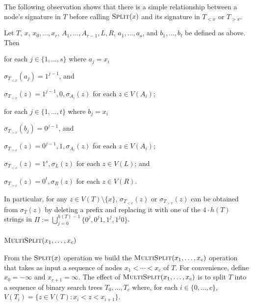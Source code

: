 \documentclass[10pt, conference, compsocconf]{IEEEtran}
\let\le\leqslant
\begin{document}

The following observation shows that there is a simple relationship between a node's signature in $T$ before calling $\textsc{Split}(x)$ and its signature in $T_{<x}$ or $T_{>x}$.

\begin{obs}
  Let $T$, $x$, $x_0,\dots,x_r$, $A_1,\dots,A_{r-1},L,R$, $a_1,\dots,a_s$, and $b_1,\dots,b_t$ be defined as above. Then
  \begin{compactenum}
    \item for each $j\in\{1,\dots,s\}$ where $a_j=x_i$
    \begin{compactenum}
      \item $\sigma_{T_{<x}}(a_j)=1^{j-1}$, and
      \item $\sigma_{T_{<x}}(z) = 1^{j-1},0,\sigma_{A_i}(z)$ for each $z\in V(A_i)$;
    \end{compactenum}
    \item for each $j\in\{1,\dots,t\}$ where $b_j=x_i$
    \begin{compactenum}
      \item $\sigma_{T_{>x}}(b_j)=0^{j-1}$, and
      \item $\sigma_{T_{>x}}(z) = 0^{j-1},1,\sigma_{A_i}(z)$ for each $z\in V(A_i)$;
    \end{compactenum}
    \item $\sigma_{T_{<x}}(z)=1^s,\sigma_L(z)$ for each $z\in V(L)$; and
    \item $\sigma_{T_{>x}}(z)=0^t,\sigma_R(z)$ for each $z\in V(R)$.
  \end{compactenum}
  In particular, for any $z\in V(T)\setminus\{x\}$, $\sigma_{T_{<x}}(z)$ or $\sigma_{T_{>x}}(z)$ can be obtained from $\sigma_T(z)$ by deleting a prefix and replacing it with one of the $4\cdot h(T)$ strings in $\Pi:=\bigcup_{j=0}^{h(T)-1}\{0^j,0^j1,1^j,1^j0\}$.
\end{obs}

\subsubsection{$\textsc{MultiSplit}(x_1,\dots,x_c)$}

From the $\textsc{Split}(x)$ operation we build the $\textsc{MultiSplit}(x_1,\dots,x_c)$ operation that takes as input a sequence of nodes $x_1<\cdots<x_c$ of $T$.  For convenience, define $x_0=-\infty$ and $x_{c+1}=\infty$.  The effect of $\textsc{MultiSplit}(x_1,\dots,x_c)$ is to split $T$ into a sequence of binary search trees $T_0,\dots,T_{c}$ where, for each $i\in\{0,\dots,c\}$, $V(T_i)=\{z\in V(T): x_i< z<x_{i+1}\}$.
\end{document}
